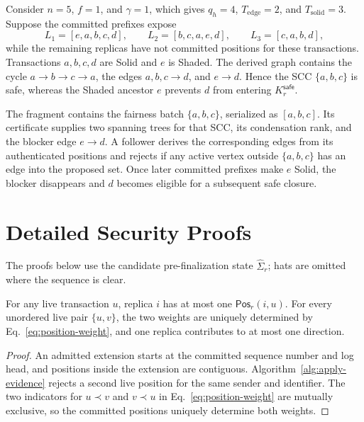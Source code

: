 Consider $n=5$, $f=1$, and $\gamma=1$, which gives $q_h=4$,
$T_{\mathrm{edge}}=2$, and $T_{\mathrm{solid}}=3$.  Suppose the committed prefixes expose
\[
 L_1=[e,a,b,c,d],\qquad
 L_2=[b,c,a,e,d],\qquad
 L_3=[c,a,b,d],
\]
while the remaining replicas have not committed positions for these transactions.  Transactions $a,b,c,d$ are Solid and $e$ is Shaded.  The derived graph contains the cycle $a\to b\to c\to a$, the edges $a,b,c\to d$, and $e\to d$.  Hence the SCC $\{a,b,c\}$ is safe, whereas the Shaded ancestor $e$ prevents $d$ from entering $K_r^{\mathsf{safe}}$.

The fragment contains the fairness batch $\{a,b,c\}$, serialized as $[a,b,c]$.  Its certificate supplies two spanning trees for that SCC, its condensation rank, and the blocker edge $e\to d$.  A follower derives the corresponding edges from its authenticated positions and rejects if any active vertex outside $\{a,b,c\}$ has an edge into the proposed set.  Once later committed prefixes make $e$ Solid, the blocker disappears and $d$ becomes eligible for a subsequent safe closure.

\section{Detailed Security Proofs}
\label{app:autig-security-details}

The proofs below use the candidate pre-finalization state
$\widehat\Sigma_r$; hats are omitted where the sequence is clear.

\begin{lemma}
\label{lem:position-uniqueness}
For any live transaction $u$, replica $i$ has at most one
$\mathsf{Pos}_r(i,u)$.  For every unordered live pair $\{u,v\}$, the two
weights are uniquely determined by Eq.~\eqref{eq:position-weight}, and one
replica contributes to at most one direction.
\end{lemma}

\begin{proof}
An admitted extension starts at the committed sequence number and log head,
and positions inside the extension are contiguous.  Algorithm~\ref{alg:apply-evidence}
rejects a second live position for the same sender and identifier.  The two
indicators for $u\prec v$ and $v\prec u$ in Eq.~\eqref{eq:position-weight}
are mutually exclusive, so the committed positions uniquely determine both
weights.
\end{proof}

